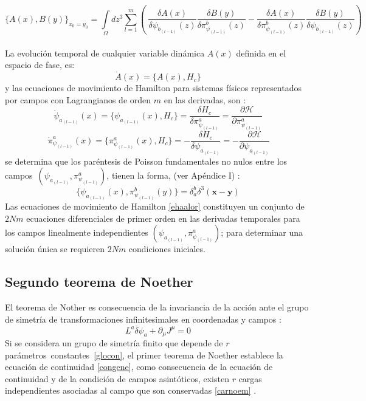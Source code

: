 \documentclass[a4paper,12pt]{article}
\begin{document}
{\small
\begin{equation}
\{A(x),B(y)\}_{x_0=y_0}=\int\limits_{\Omega}dz^3\sum\limits_{l=1}^{m}\left(\ \frac{\delta A(x)}{\delta\psi_{b_{(l-1)}}(z)}\frac{\delta B(y)}{\delta \pi^{b}_{\psi_{(l-1)}}(z) }-\frac{\delta A(x)}{\delta \pi^{b}_{\psi_{(l-1)}}(z)}\frac{\delta B(y)}{\delta\psi_{b_{(l-1)}}(z)}\right)
\label{genepare} 
\end{equation}}\\
La evolución temporal de cualquier variable dinámica $A(x)$ definida en el espacio de fase, es:
\begin{equation}
\dot A(x)=\{A(x),H_c\} 
\end{equation}
y las ecuaciones de movimiento de Hamilton para sistemas físicos representados por campos con Lagrangianos de  orden $m$ en las derivadas, son \cite{general,canoalor,tesis}:
\begin{equation}
\dot\psi_{a_{(l-1)}}(x)=\{\psi_{a_{(l-1)}}(x),H_c\}=\frac{\delta H_c}{\delta\pi^{a}_{\psi_{(l-1)}}} =\frac{\partial \mathscr{H}}{\partial\pi^{a}_{\psi_{(l-1)}}}
\label{ehaalor}
\end{equation}
$$\ \dot\pi^{a}_{\psi_{(l-1)}}(x)=\{\pi^{a}_{\psi_{(l-1)}}(x),H_c\}=-\frac{\delta H_c}{\delta \psi_{a_{(l-1)}}}=-\frac{\partial \mathscr{H}}{\partial \psi_{a_{(l-1)}}}$$
se determina que los paréntesis de Poisson fundamentales no nulos entre los \mbox{campos $(\psi_{a_{(l-1)}},\pi^{a}_{\psi_{(l-1)}})$}, tienen la forma, (ver Apéndice I) \cite{general,canoalor,tesis}:
\begin{equation}
\{\psi_{a_{(l-1)}}(x),\pi^{b}_{\psi_{(l-1)}}(y)\}=\delta_{a}^{b}\delta^3(\textbf{x}-\textbf{y}) 
\end{equation}
Las ecuaciones de movimiento de Hamilton \eqref{ehaalor} constituyen un conjunto de $2Nm$ \mbox{ecuaciones} diferenciales de primer orden en las derivadas temporales para los campos \mbox{linealmente} independientes $(\psi_{a_{(l-1)}},\pi^{a}_{\psi_{(l-1)}})$; para determinar una solución única se requieren $2Nm$ condiciones iniciales.
\subsection{Segundo teorema de Noether}
El teorema de Nother es consecuencia de la invariancia de la acción ante el grupo de simetría de transformaciones infinitesimales en coordenadas y campos \cite{noether,greiner,local}:
\begin{equation}
L^a\overset{\_}{\delta}\psi_a+\partial_\mu J^\mu=0  
\label{ten}
\end{equation}
Si se considera un grupo de simetría finito que depende de $r$ \mbox{parámetros }\mbox{constantes \eqref{glocon}}, el primer teorema de Noether establece la ecuación de continuidad \eqref{congene}, como consecuencia de la ecuación de continuidad y de la condición de campos asintóticos, existen $r$ cargas independientes asociadas al campo que son conservadas \eqref{carnoem} \cite{noether,greiner}. 
\\
\end{document}
